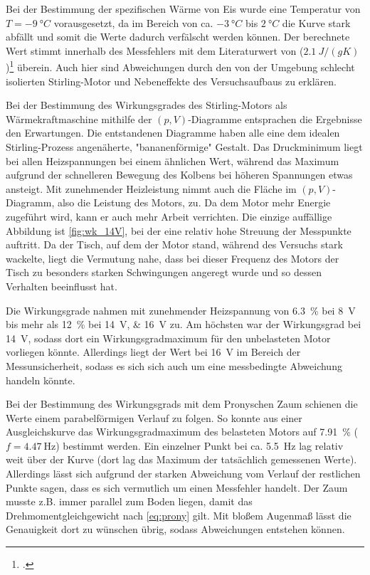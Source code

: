 Bei der Bestimmung der spezifischen Wärme von Eis wurde eine Temperatur von $T = \SI{-9}{°C}$ vorausgesetzt, da im Bereich von ca. $\SI{-3}{°C}$ bis $\SI{2}{°C}$ die Kurve stark abfällt und somit die Werte dadurch verfälscht werden können. Der berechnete Wert stimmt innerhalb des Messfehlers mit dem Literaturwert von ($\SI{2.1}{J/(gK)}$)\footcite[S. 630]{taschenbuch} überein. Auch hier sind Abweichungen durch den von der Umgebung schlecht isolierten Stirling-Motor und Nebeneffekte des Versuchsaufbaus zu erklären.

Bei der Bestimmung des Wirkungsgrades des Stirling-Motors als Wärmekraftmaschine mithilfe der $(p, V)$-Diagramme entsprachen die Ergebnisse den Erwartungen. Die entstandenen Diagramme haben alle eine dem idealen Stirling-Prozess angenäherte, "bananenförmige" Gestalt. Das Druckminimum liegt bei allen Heizspannungen bei einem ähnlichen Wert, während das Maximum aufgrund der schnelleren Bewegung des Kolbens bei höheren Spannungen etwas ansteigt. Mit zunehmender Heizleistung nimmt auch die Fläche im $(p, V)$-Diagramm, also die Leistung des Motors, zu. Da dem Motor mehr Energie zugeführt wird, kann er auch mehr Arbeit verrichten. Die einzige auffällige Abbildung ist \cref{fig:wk_14V}, bei der eine relativ hohe Streuung der Messpunkte auftritt. Da der Tisch, auf dem der Motor stand, während des Versuchs stark wackelte, liegt die Vermutung nahe, dass bei dieser Frequenz des Motors der Tisch zu besonders starken Schwingungen angeregt wurde und so dessen Verhalten beeinflusst hat.

Die Wirkungsgrade nahmen mit zunehmender Heizspannung von \SI{6,3}{\%} bei \SI{8}{\V} bis mehr als \SI{12}{\%} bei \SIlist{14; 16}{\V} zu. Am höchsten war der Wirkungsgrad bei \SI{14}{\V}, sodass dort ein Wirkungsgradmaximum für den unbelasteten Motor vorliegen könnte. Allerdings liegt der Wert bei \SI{16}{\V} im Bereich der Messunsicherheit, sodass es sich sich auch um eine messbedingte Abweichung handeln könnte.

Bei der Bestimmung des Wirkungsgrads mit dem Pronyschen Zaum schienen die Werte einem parabelförmigen Verlauf zu folgen. So konnte aus einer Ausgleichskurve das Wirkungsgradmaximum des belasteten Motors auf 
\SI{7.91}{\%} ($f = \SI{4.47}{\Hz}$) bestimmt werden. Ein einzelner Punkt bei ca. \SI{5,5}{\Hz} lag relativ weit über der Kurve (dort lag das Maximum der tatsächlich gemessenen Werte). Allerdings lässt sich aufgrund der starken Abweichung vom Verlauf der restlichen Punkte sagen, dass es sich vermutlich um einen Messfehler handelt. Der Zaum musste z.B. immer parallel zum Boden liegen, damit das Drehmomentgleichgewicht nach \cref{eq:prony} gilt. Mit bloßem Augenmaß lässt die Genauigkeit dort zu wünschen übrig, sodass Abweichungen entstehen können.